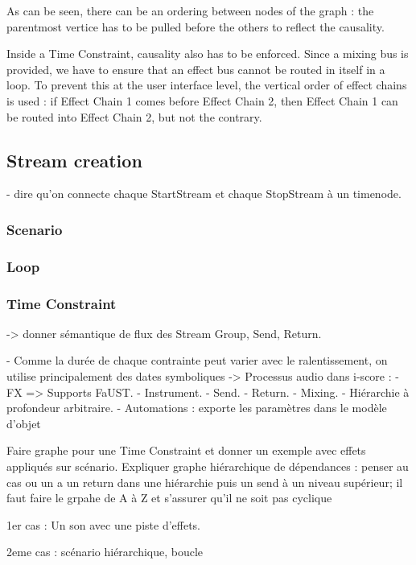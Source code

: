 \documentclass{article}
\begin{document}
As can be seen, there can be an ordering between nodes of the graph : the parentmost vertice
has to be pulled before the others to reflect the causality.

Inside a Time Constraint, causality also has to be enforced. 
Since a mixing bus is provided, we have to ensure that an effect bus cannot be routed in 
itself in a loop. 
To prevent this at the user interface level, the vertical order of effect chains is used : 
if Effect Chain 1 comes before Effect Chain 2, then Effect Chain 1 can be routed into Effect Chain 2, but not the contrary.


\subsection{Stream creation}
- dire qu'on connecte chaque StartStream et chaque StopStream à un timenode.
\subsubsection{Scenario}
\subsubsection{Loop}
\subsubsection{Time Constraint}

-> donner sémantique de flux des Stream Group, Send, Return.

- Comme la durée de chaque contrainte peut varier avec le ralentissement, on utilise principalement 
des dates symboliques
-> Processus audio dans i-score : 
- FX => Supports FaUST.
- Instrument.
- Send.
- Return.
- Mixing.
- Hiérarchie à profondeur arbitraire.
- Automations : exporte les paramètres dans le modèle d'objet

Faire graphe pour une Time Constraint et donner un exemple avec effets appliqués sur scénario.
Expliquer graphe hiérarchique de dépendances : penser au cas ou un a un return dans une hiérarchie puis un send à un niveau supérieur; il faut faire le grpahe de A à Z et s'assurer qu'il ne soit pas cyclique

1er cas : 
Un son avec une piste d'effets.

2eme cas : scénario hiérarchique, boucle
\end{document}
